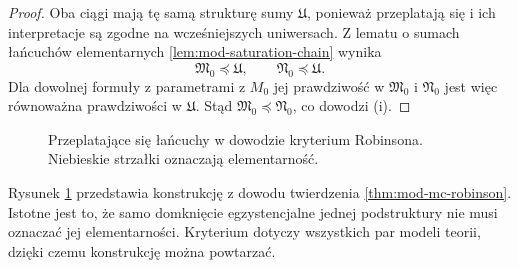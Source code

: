 \begin{proof}
Oba ciągi mają tę samą strukturę sumy $\mathfrak U$,
ponieważ przeplatają się i ich interpretacje są zgodne
na wcześniejszych uniwersach. Z lematu o sumach łańcuchów
elementarnych \ref{lem:mod-saturation-chain} wynika
\[
\mathfrak M_0\preccurlyeq\mathfrak U,
\qquad \mathfrak N_0\preccurlyeq\mathfrak U.
\]
Dla dowolnej formuły z parametrami z $M_0$ jej
prawdziwość w $\mathfrak M_0$ i $\mathfrak N_0$
jest więc równoważna prawdziwości w $\mathfrak U$.
Stąd $\mathfrak M_0\preccurlyeq\mathfrak N_0$,
co dowodzi (i).
\end{proof}

\begin{figure}[htbp]
\centering
{}
\caption{Przeplatające się łańcuchy w dowodzie kryterium
Robinsona. Niebieskie strzałki oznaczają elementarność.}
\label{fig:mod-mc-robinson-chain}
\end{figure}

Rysunek \ref{fig:mod-mc-robinson-chain} przedstawia
konstrukcję z dowodu twierdzenia \ref{thm:mod-mc-robinson}.
Istotne jest to, że samo domknięcie egzystencjalne jednej
podstruktury nie musi oznaczać jej elementarności.
Kryterium dotyczy wszystkich par modeli teorii, dzięki
czemu konstrukcję można powtarzać.


